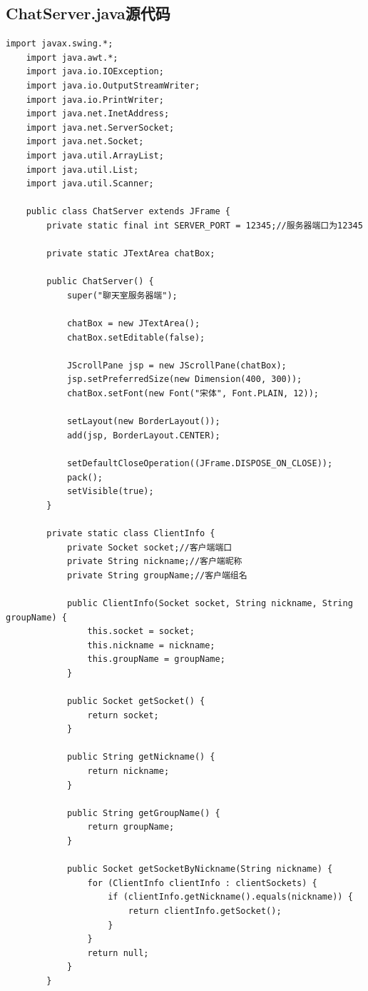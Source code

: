 \documentclass[UTF8,12pt]{article}
\begin{document}
\subsection{ChatServer.java源代码}
\begin{lstlisting}[title=ChatServer.java源代码,frame=shadowbox]
    import javax.swing.*;
    import java.awt.*;
    import java.io.IOException;
    import java.io.OutputStreamWriter;
    import java.io.PrintWriter;
    import java.net.InetAddress;
    import java.net.ServerSocket;
    import java.net.Socket;
    import java.util.ArrayList;
    import java.util.List;
    import java.util.Scanner;
    
    public class ChatServer extends JFrame {
        private static final int SERVER_PORT = 12345;//服务器端口为12345
    
        private static JTextArea chatBox;
    
        public ChatServer() {
            super("聊天室服务器端");
    
            chatBox = new JTextArea();
            chatBox.setEditable(false);
    
            JScrollPane jsp = new JScrollPane(chatBox);
            jsp.setPreferredSize(new Dimension(400, 300));
            chatBox.setFont(new Font("宋体", Font.PLAIN, 12));
    
            setLayout(new BorderLayout());
            add(jsp, BorderLayout.CENTER);
    
            setDefaultCloseOperation((JFrame.DISPOSE_ON_CLOSE));
            pack();
            setVisible(true);
        }
    
        private static class ClientInfo {
            private Socket socket;//客户端端口
            private String nickname;//客户端昵称
            private String groupName;//客户端组名
    
            public ClientInfo(Socket socket, String nickname, String groupName) {
                this.socket = socket;
                this.nickname = nickname;
                this.groupName = groupName;
            }
    
            public Socket getSocket() {
                return socket;
            }
    
            public String getNickname() {
                return nickname;
            }
    
            public String getGroupName() {
                return groupName;
            }
    
            public Socket getSocketByNickname(String nickname) {
                for (ClientInfo clientInfo : clientSockets) {
                    if (clientInfo.getNickname().equals(nickname)) {
                        return clientInfo.getSocket();
                    }
                }
                return null;
            }
        }
    

\end{lstlisting}
\end{document}
